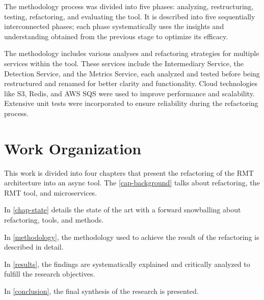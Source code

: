 The methodology process was divided into five phases: analyzing, restructuring, testing, refactoring, and evaluating the tool. It is described into five sequentially interconnected phases; each phase systematically uses the insights and understanding obtained from the previous stage to optimize its efficacy.
 
The methodology includes various analyses and refactoring strategies for multiple services within the tool. These services include the Intermediary Service, the Detection Service, and the Metrics Service, each analyzed and tested before being restructured and renamed for better clarity and functionality. Cloud technologies like S3, Redis, and AWS SQS were used to improve performance and scalability. Extensive unit tests were incorporated to ensure reliability during the refactoring process.

\section{Work Organization}

This work is divided into four chapters that present the refactoring of the RMT architecture into an async tool. The \cref{cap-background} talks about refactoring, the RMT tool, and microservices.

In \cref{chap-state} details the state of the art with a forward snowballing about refactoring, tools, and methods.

In \cref{methodology}, the methodology used to achieve the result of the refactoring is described in detail.

In \cref{results}, the findings are systematically explained and critically analyzed to fulfill the research objectives.

In \cref{conclusion}, the final synthesis of the research is presented.